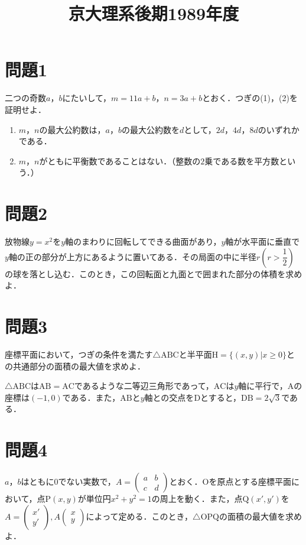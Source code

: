\documentclass[unicode,12pt, A4j]{ltjsarticle}%
\title{京大理系後期1989年度}
\begin{document}
\section{問題1}
二つの奇数$a$，$b$にたいして，$m=11a+b$，$n=3a+b$とおく．つぎの(1)，(2)を証明せよ．
\begin{enumerate}
 \item $m$，$n$の最大公約数は，$a$，$b$の最大公約数を$d$として，$2d$，$4d$，$8d$のいずれかである．
 \item $m$，$n$がともに平衡数であることはない．（整数の$2$乗である数を平方数という．）
\end{enumerate}

\section{問題2}
放物線$y=x^2$を$y$軸のまわりに回転してできる曲面があり，$y$軸が水平面に垂直で$y$軸の正の部分が上方にあるように置いてある．その局面の中に半径$r \left(r>\dfrac{1}{2}\right)$の球を落とし込む．このとき，この回転面と九面とで囲まれた部分の体積を求めよ．

\section{問題3}
座標平面において，つぎの条件を満たす$\triangle \mathrm{ABC}$と半平面$\mathrm{H}=\{(x,y)|x\ge 0\}$との共通部分の面積の最大値を求めよ．

$\triangle \mathrm{ABC}$は$\mathrm{AB}=\mathrm{AC}$であるような二等辺三角形であって，$\mathrm{AC}$は$y$軸に平行で，$\mathrm{A}$の座標は$(-1,0)$である．また，$\mathrm{AB}$と$y$軸との交点を$\mathrm{D}$とすると，$\mathrm{DB}=2\sqrt{3}$である．

\section{問題4}
$a$，$b$はともに$0$でない実数で，$A=\begin{pmatrix} a&b\\c&d \end{pmatrix}$とおく．$\mathrm{O}$を原点とする座標平面において，点$\mathrm{P}(x,y)$が単位円$x^2+y^2=1$の周上を動く．また，点$\mathrm{Q}(x',y')$を$A=\begin{pmatrix} x'\\y'\end{pmatrix}, A\begin{pmatrix} x\\y\end{pmatrix}$によって定める．このとき，$\triangle \mathrm{OPQ}$の面積の最大値を求めよ．
\end{document}

